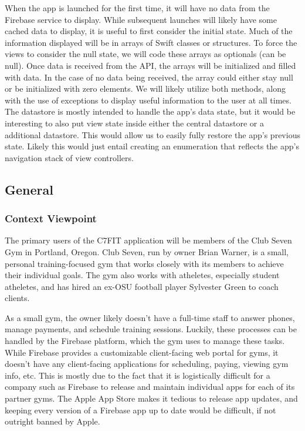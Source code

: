 \documentclass[letterpaper,10pt,titlepage]{article}
\begin{document}
When the app is launched for the first time, it will have no data from the Firebase service to display. While subsequent launches will likely have some cached data to display, it is useful to first consider the initial state. Much of the information displayed will be in arrays of Swift classes or structures. To force the views to consider the null state, we will code these arrays as optionals (can be null). Once data is received from the API, the arrays will be initialized and filled with data. In the case of no data being received, the array could either stay null or be initialized with zero elements. We will likely utilize both methods, along with the use of exceptions to display useful information to the user at all times. \\

The datastore is mostly intended to handle the app's data state, but it would be interesting to also put view state inside either the central datastore or a additional datastore. This would allow us to easily fully restore the app's previous state. Likely this would just entail creating an enumeration that reflects the app's navigation stack of view controllers.

\subsection{General}

\subsubsection{Context Viewpoint}
The primary users of the C7FIT application will be members of the Club Seven Gym in Portland, Oregon. Club Seven, run by owner Brian Warner, is a small, personal training-focused gym that works closely with its members to achieve their individual goals. The gym also works with atheletes, especially student atheletes, and has hired an ex-OSU football player Sylvester Green to coach clients.

As a small gym, the owner likely doesn't have a full-time staff to answer phones, manage payments, and schedule training sessions. Luckily, these processes can be handled by the Firebase platform, which the gym uses to manage these tasks. While Firebase provides a customizable client-facing web portal for gyms, it doesn't have any client-facing applications for scheduling, paying, viewing gym info, etc. This is mostly due to the fact that it is logistically difficult for a company such as Firebase to release and maintain individual apps for each of its partner gyms. The Apple App Store makes it tedious to release app updates, and keeping every version of a Firebase app up to date would be difficult, if not outright banned by Apple.
\end{document}
